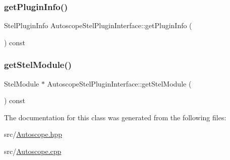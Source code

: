 \subsubsection{\texorpdfstring{getPluginInfo()}{getPluginInfo()}}
{\footnotesize\ttfamily Stel\+Plugin\+Info Autoscope\+Stel\+Plugin\+Interface\+::get\+Plugin\+Info (\begin{DoxyParamCaption}{ }\end{DoxyParamCaption}) const\hspace{0.3cm}{\ttfamily [virtual]}}

\mbox{\label{class_autoscope_stel_plugin_interface_a681456cfd440703d70f3fbf1b5a07887}} 
\subsubsection{\texorpdfstring{getStelModule()}{getStelModule()}}
{\footnotesize\ttfamily Stel\+Module $\ast$ Autoscope\+Stel\+Plugin\+Interface\+::get\+Stel\+Module (\begin{DoxyParamCaption}{ }\end{DoxyParamCaption}) const\hspace{0.3cm}{\ttfamily [virtual]}}



The documentation for this class was generated from the following files\+:\begin{DoxyCompactItemize}
\item 
src/\mbox{\hyperlink{_autoscope_8hpp}{Autoscope.\+hpp}}\item 
src/\mbox{\hyperlink{_autoscope_8cpp}{Autoscope.\+cpp}}\end{DoxyCompactItemize}
